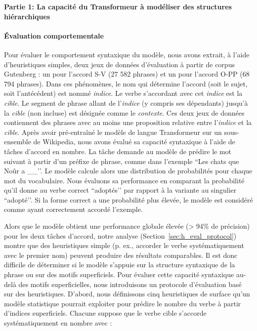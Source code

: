\noindent \textbf{Partie 1: La capacité du Transformeur à modéliser des structures hiérarchiques} 
\vspace{-1.0\baselineskip}

\paragraph{Évaluation comportementale} Pour évaluer le comportement syntaxique du modèle, nous avons extrait, à l’aide d’heuristiques simples, deux jeux de données d'évaluation à partir de corpus Gutenberg : un pour l'accord S-V (27 582 phrases) et un pour l'accord O-PP (68 794 phrases).
Dans ces phénomènes, le nom qui détermine l'accord (soit le sujet, soit l'antécédent) est nommé \emph{indice}. Le verbe s'accordant avec cet \emph{indice} est la \emph{cible}. Le segment de phrase allant de l'\emph{indice} (y compris ses dépendants) jusqu'à la \emph{cible} (non incluse) est désignée comme le \emph{contexte}. Ces deux jeux de données contiennent des phrases avec au moins une proposition relative entre l'\emph{indice} et la \emph{cible}. Après avoir pré-entraîné le modèle de langue Transformeur sur un sous-ensemble de Wikipedia, nous avons évalué sa capacité syntaxique à l'aide de tâches d'accord en nombre. La tâche demande au modèle de prédire le mot suivant à partir d'un préfixe de phrase, comme dans l'exemple ``Les chats que Noûr a \_\_’’. Le modèle calcule alors une distribution de probabilités pour chaque mot du vocabulaire. Nous évaluons sa performance en comparant la probabilité qu'il donne au verbe correct ``adoptés’’ par rapport à la variante au singulier ``adopté’’. Si la forme correct a une probabilité plus élevée, le modèle est considéré comme ayant correctement accordé l'exemple.

Alors que le modèle obtient une performance globale élevée (> 94\% de précision) pour les deux tâches d'accord, notre analyse (Section~\ref{sec:h_eval_protocol}) montre que des heuristiques simple (p. ex., accorder le verbe systématiquement avec le premier nom) peuvent produire des résultats comparables. Il est donc difficile de déterminer si le modèle s'appuie sur la structure syntaxique de la phrase ou sur des motifs superficiels. Pour évaluer cette capacité syntaxique au-delà des motifs superficielles, nous introduisons un protocole d'évaluation basé sur des heuristiques. D'abord, nous définissons cinq heuristiques de surface qu'un modèle statistique pourrait exploiter pour prédire le nombre du verbe à partir d'indices superficiels. Chacune suppose que le verbe cible s'accorde systématiquement en nombre avec :

